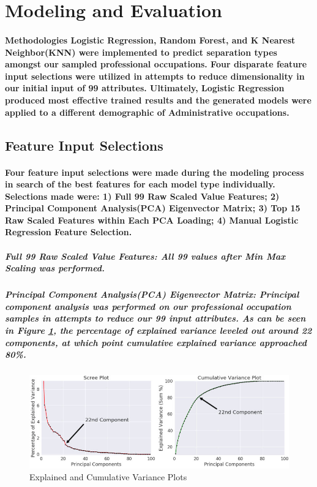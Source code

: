 \documentclass{article}
\begin{document}
\section{Modeling and Evaluation}

\paragraph{Methodologies Logistic Regression, Random Forest, and K Nearest Neighbor(KNN) were implemented to predict separation types amongst our sampled professional occupations. Four disparate feature input selections were utilized in attempts to reduce dimensionality in our initial input of 99 attributes. Ultimately, Logistic Regression produced most effective trained results and the generated models were applied to a different demographic of Administrative occupations.}
 
\subsection{Feature Input Selections}

\paragraph{Four feature input selections were made during the modeling process in search of the best features for each model type individually. Selections made were: 1) Full 99 Raw Scaled Value Features; 2) Principal Component Analysis(PCA) Eigenvector Matrix; 3) Top 15 Raw Scaled Features within Each PCA Loading; 4) Manual Logistic Regression Feature Selection.}

\subparagraph{Full 99 Raw Scaled Value Features: All 99 values after Min Max Scaling was performed.}

\subparagraph{Principal Component Analysis(PCA) Eigenvector Matrix: Principal component analysis was performed on our professional occupation samples in attempts to reduce our 99 input attributes. As can be seen in Figure \ref{fig:PCA_Scree_CumVar}, the percentage of explained variance leveled out around 22 components, at which point cumulative explained variance approached 80\%.}

\subparagraph{}
\begin{figure}[H]
\centering
\includegraphics[width=\linewidth]{PCA_Scree_CumVar.jpg}
\caption{Explained and Cumulative Variance Plots}
\label{fig:PCA_Scree_CumVar}
\end{figure}
\end{document}
